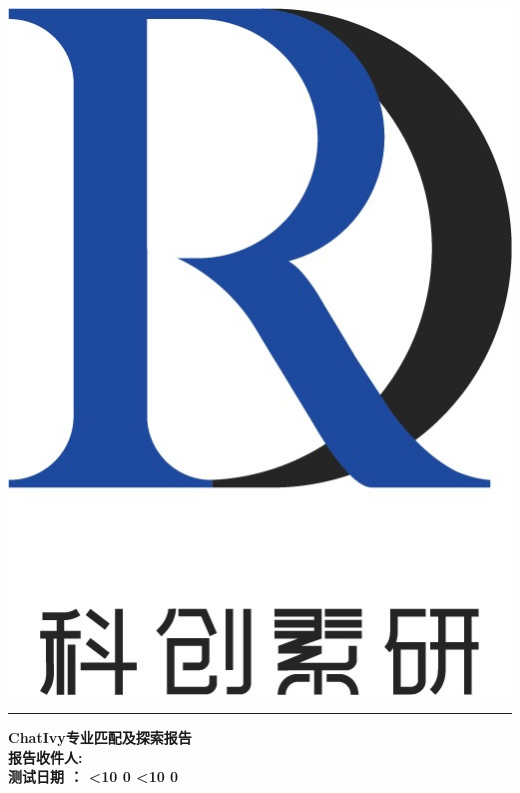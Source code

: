 \documentclass[12pt]{article}
\newcommand{\insertname}{
}
\newcommand{\customdate}{
    \the\year年\hspace{0.5em}%
    \ifnum\month<10 0\fi\the\month月\hspace{0.5em}%
    \ifnum\day<10 0\fi\the\day日%
}
\begin{document}
\thispagestyle{empty} 
\begin{CJK*}{UTF8}{gbsn}

\noindent\hfill\begin{minipage}{2.0cm} %
   \includegraphics[width=\textwidth]{logo.jpg}\\
\end{minipage}
\vspace{-3.7cm}

\noindent\textcolor{darkblue}{\rule{\textwidth}{5pt}} %

\vspace{10pt} %
{\noindent\Large\bfseries\hspace*{0.5cm}ChatIvy专业匹配及探索报告}\\[12pt] %
{\noindent\large\bfseries\hspace*{0.5cm}报告收件人: \insertname}\\[10pt] %
{\noindent\large\bfseries\hspace*{0.5cm}测试日期 ：\customdate}
\vspace{10pt}


\end{CJK*}
\end{document}
